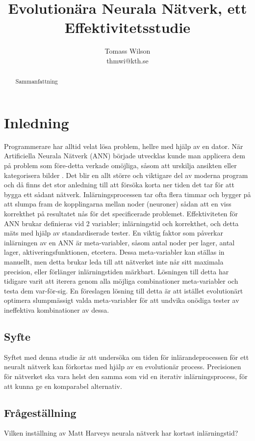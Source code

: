 \documentclass[a4paper, 11pt, twocolumn]{report}
\title{Evolutionära Neurala Nätverk, ett Effektivitetsstudie}
\author{Tomass Wilson\\thmwi@kth.se}
\begin{document}
  \maketitle

  \begin{abstract}
    Sammanfattning
  \end{abstract}

  \tableofcontents

  \section{Inledning}
    Programmerare har alltid velat lösa problem, hellre med hjälp av en dator. När Artificiella Neurala Nätverk (ANN) började utvecklas kunde man applicera dem på problem som före-detta verkade omöjliga, såsom att urskilja ansikten eller kategorisera bilder \parencite{hopfield1988artificial}. Det blir en allt större och viktigare del av moderna program och då finns det stor anledning till att försöka korta ner tiden det tar för att bygga ett sådant nätverk. Inlärningsprocessen tar ofta flera timmar och bygger på att slumpa fram de kopplingarna mellan noder (neuroner) sådan att en viss korrekthet på resultatet nås för det specificerade problemet. Effektiviteten för ANN brukar definieras vid 2 variabler; inlärningstid och korrekthet, och detta mäts med hjälp av standardiserade tester. En viktig faktor som påverkar inlärningen av en ANN är meta-variabler, såsom antal noder per lager, antal lager, aktiveringsfunktionen, etcetera. Dessa meta-variabler kan ställas in manuellt, men detta brukar leda till att nätverket inte når sitt maximala precision, eller förlänger inlärningstiden märkbart. Lösningen till detta har tidigare varit att iterera genom alla möjliga combinationer meta-variabler och testa dem var-för-sig. En föreslagen lösning till detta är att istället evolutionärt optimera slumpmässigt valda meta-variabler för att undvika onödiga tester av ineffektiva kombinationer av dessa.

    \subsection{Syfte}
    Syftet med denna studie är att undersöka om tiden för inlärandeprocessen för ett neuralt nätverk kan förkortas med hjälp av en evolutionär process. Precisionen för nätverket ska vara helst den samma som vid en iterativ inlärningsprocess, för att kunna ge en komparabel alternativ.
    \subsection{Frågeställning}
    Vilken inställning av Matt Harveys neurala nätverk har kortast inlärningstid?
\end{document}
